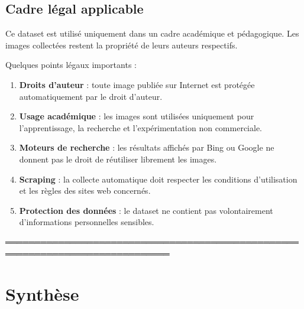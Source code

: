 \documentclass[12pt,a4paper]{article}
\begin{document}
\subsection{Cadre légal applicable}

\begin{tcolorbox}[colback=lightgray, colframe=primary, title=\textbf{Avertissement}]
Ce dataset est utilisé uniquement dans un cadre académique et pédagogique.  
Les images collectées restent la propriété de leurs auteurs respectifs.
\end{tcolorbox}

Quelques points légaux importants :

\begin{enumerate}[label=\textbf{\arabic*.}]
    \item \textbf{Droits d’auteur} : toute image publiée sur Internet est protégée automatiquement par le droit d’auteur.

    \item \textbf{Usage académique} : les images sont utilisées uniquement pour l’apprentissage, la recherche et l’expérimentation non commerciale.

    \item \textbf{Moteurs de recherche} : les résultats affichés par Bing ou Google ne donnent pas le droit de réutiliser librement les images.

    \item \textbf{Scraping} : la collecte automatique doit respecter les conditions d’utilisation et les règles des sites web concernés.

    \item \textbf{Protection des données} : le dataset ne contient pas volontairement d’informations personnelles sensibles.
\end{enumerate}
══════════════════════════════════════════════════════════════════════════════
\section{Synthèse}
\end{document}
